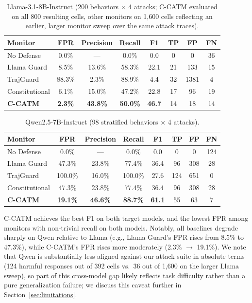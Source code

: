 \documentclass[11pt]{article}
\begin{document}
\begin{table}[H]
\centering
\caption{Llama-3.1-8B-Instruct (200 behaviors $\times$ 4 attacks; C-CATM evaluated on all 800 resulting cells, other monitors on 1{,}600 cells reflecting an earlier, larger monitor sweep over the same attack traces).}
\label{tab:llama}
\begin{tabular}{lccccccc}
\toprule
Monitor & FPR & Precision & Recall & F1 & TP & FP & FN \\
\midrule
No Defense & 0.0\% &---& 0.0\% & 0.0 & 0 & 0 & 36 \\
Llama Guard & 8.5\% & 13.6\% & 58.3\% & 22.1 & 21 & 133 & 15 \\
TrajGuard & 88.3\% & 2.3\% & 88.9\% & 4.4 & 32 & 1381 & 4 \\
Constitutional & 6.1\% & 15.0\% & 47.2\% & 22.8 & 17 & 96 & 19 \\
\textbf{C-CATM} & \textbf{2.3\%} & \textbf{43.8\%} & \textbf{50.0\%} & \textbf{46.7} & 14 & 18 & 14 \\
\bottomrule
\end{tabular}
\end{table}

\begin{table}[H]
\centering
\caption{Qwen2.5-7B-Instruct (98 stratified behaviors $\times$ 4 attacks).}
\label{tab:qwen}
\begin{tabular}{lccccccc}
\toprule
Monitor & FPR & Precision & Recall & F1 & TP & FP & FN \\
\midrule
No Defense & 0.0\% &---& 0.0\% & 0.0 & 0 & 0 & 124 \\
Llama Guard & 47.3\% & 23.8\% & 77.4\% & 36.4 & 96 & 308 & 28 \\
TrajGuard & 100.0\% & 16.0\% & 100.0\% & 27.6 & 124 & 651 & 0 \\
Constitutional & 47.3\% & 23.8\% & 77.4\% & 36.4 & 96 & 308 & 28 \\
\textbf{C-CATM} & \textbf{19.1\%} & \textbf{46.6\%} & \textbf{88.7\%} & \textbf{61.1} & 55 & 63 & 7 \\
\bottomrule
\end{tabular}
\end{table}

C-CATM achieves the best F1 on both target models, and the lowest FPR among monitors with non-trivial recall on both models. Notably, all baselines degrade sharply on Qwen relative to Llama (e.g., Llama Guard's FPR rises from 8.5\% to 47.3\%), while C-CATM's FPR rises more moderately (2.3\% $\to$ 19.1\%). We note that Qwen is substantially less aligned against our attack suite in absolute terms (124 harmful responses out of 392 cells vs.\ 36 out of 1{,}600 on the larger Llama sweep), so part of this cross-model gap likely reflects task difficulty rather than a pure generalization failure; we discuss this caveat further in Section~\ref{sec:limitations}.
\end{document}

